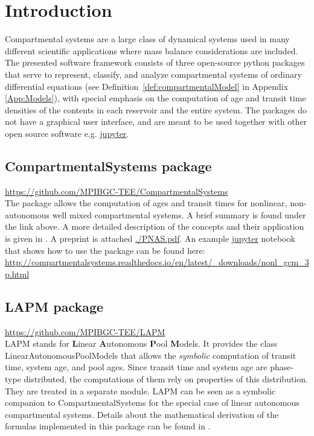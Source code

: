 \documentclass[a4paper]{article}
\DeclareRobustCommand{\Defref}[1]{\mbox{Definition \ref{#1}}}
\DeclareRobustCommand{\Appendixref}[1]{Appendix \ref{#1}}
\begin{document}
\section{Introduction}
Compartmental systems are a large class of dynamical systems used in many different scientific applications
where mass balance considerations are included.
The presented software framework consists of three open-source python packages 
that serve to represent, classify, and analyze compartmental systems of ordinary differential equations (see \Defref{def:compartmentalModel} in \Appendixref{App:Models}), with special emphasis on the computation of age and transit time densities of the contents in each reservoir and the entire system.  
The packages do not have a graphical user interface, and are meant to be used together with other open source software e.g. \href{jupyter.org}{jupyter}. 

\subsection{CompartmentalSystems package}
\url{https://github.com/MPIBGC-TEE/CompartmentalSystems}\\
The package allows the computation of ages and transit times for nonlinear, non-autonomous well mixed compartmental systems.
A brief summary is found under the link above. A more detailed description of the concepts and their application is given in \citet[]{MetzlerMuellerSierra2018PNAS}. A preprint is attached \url{./PNAS.pdf}.
An example \href{jupyter.org}{jupyter} notebook that shows how to use the package can be found here:
\url{http://compartmentalsystems.readthedocs.io/en/latest/_downloads/nonl_gcm_3p.html}

\subsection{LAPM package}
\url{https://github.com/MPIBGC-TEE/LAPM}\\
LAPM stands for {\bf L}inear {\bf A}utonomous {\bf P}ool {\bf M}odels. It provides the class LinearAutonomousPoolModels that allows the \emph{symbolic} computation of transit time, system age, and pool ages.
Since transit time and system age are phase-type distributed, the computations of them rely on properties of this distribution. They are treated in a separate module.
LAPM can be seen as a symbolic companion to CompartmentalSystems for the special case of linear autonomous compartmental systems.
Details about the mathematical derivation of the formulas implemented in this package can be found in \citet{Metzler2018MGS}.
\end{document}
